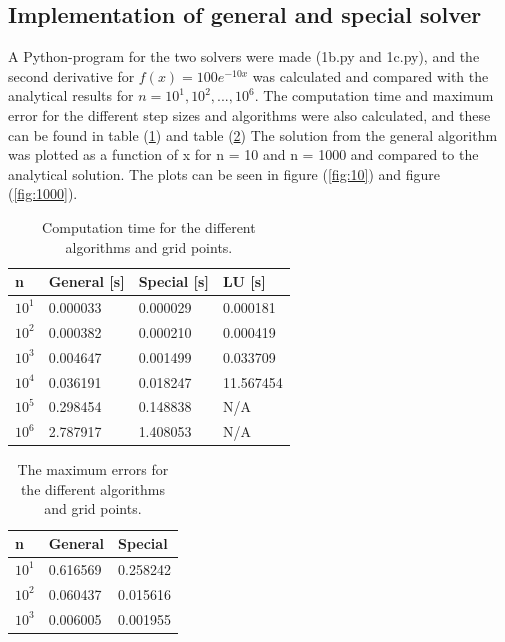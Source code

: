\documentclass[12pt]{article}
\begin{document}
\subsection{Implementation of general and special solver}
A Python-program for the two solvers were made (1\textunderscore b.py and 1\textunderscore c.py), and the second derivative for $f(x)=100e^{-10x}$ was calculated and compared with the analytical results for $n = 10^{1}, 10^{2}, ..., 10^{6}$. The computation time and maximum error for the different step sizes and algorithms were also calculated, and these can be found in table (\ref{tab:seconds}) and table (\ref{tab:error})
	The solution from the general algorithm was plotted as a function of x for n = 10 and n = 1000 and compared to the analytical solution. The plots can be seen in figure (\ref{fig:10}) and figure (\ref{fig:1000}). 

\begin{table}[]
\centering
\caption{Computation time for the different algorithms and grid points.}
\label{tab:seconds}
\begin{tabular}{|l|l|l|l|}
\hline
n    & General [s]& Special [s]& LU [s]  \\ \hline
$10^{1}$   & 0.000033        & 0.000029        &  0.000181    \\ \hline
$10^{2}$  & 0.000382        &  0.000210       &  0.000419    \\ \hline
$10^{3}$ & 0.004647       &  0.001499       &  0.033709    \\ \hline
$10^{4}$ & 0.036191       &  0.018247       & 11.567454      \\ \hline
$10^{5}$ & 0.298454       & 0.148838        &  N/A     \\ \hline
$10^{6}$ & 2.787917       & 1.408053        &  N/A    \\ \hline
\end{tabular}
\end{table}

\begin{table}[]
\centering
\caption{The maximum errors for the different algorithms and grid points.}
\label{tab:error}
\begin{tabular}{|l|l|l|}
\hline
n    & General & Special   \\ \hline
$10^{1}$  & 0.616569        & 0.258242              \\ \hline
$10^{2}$  & 0.060437        &  0.015616            \\ \hline
$10^{3}$ & 0.006005        & 0.001955           \\ \hline
\end{tabular}
\end{table}
\end{document}
